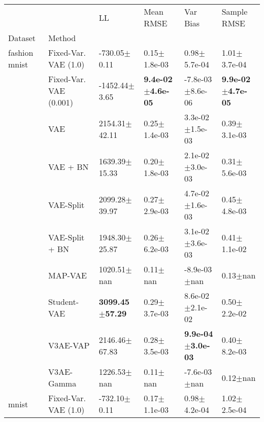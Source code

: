 \begin{tabular}{llllll}
\toprule
             &     &                           LL &                     Mean RMSE &                       Var Bias &                   Sample RMSE \\
Dataset & Method &                              &                               &                                &                               \\
\midrule
fashion mnist & Fixed-Var. VAE (1.0) &             -730.05$\pm$0.11 &              0.15$\pm$1.8e-03 &               0.98$\pm$5.7e-04 &              1.01$\pm$3.7e-04 \\
             & Fixed-Var. VAE (0.001) &            -1452.44$\pm$3.65 &  \textbf{9.4e-02$\pm$4.6e-05} &           -7.8e-03$\pm$8.6e-06 &  \textbf{9.9e-02$\pm$4.7e-05} \\
             & VAE &            2154.31$\pm$42.11 &              0.25$\pm$1.4e-03 &            3.3e-02$\pm$1.5e-03 &              0.39$\pm$3.1e-03 \\
             & VAE + BN &            1639.39$\pm$15.33 &              0.20$\pm$1.8e-03 &            2.1e-02$\pm$3.0e-03 &              0.31$\pm$5.6e-03 \\
             & VAE-Split &            2099.28$\pm$39.97 &              0.27$\pm$2.9e-03 &            4.7e-02$\pm$1.6e-03 &              0.45$\pm$4.8e-03 \\
             & VAE-Split + BN &            1948.30$\pm$25.87 &              0.26$\pm$6.2e-03 &            3.1e-02$\pm$3.6e-03 &              0.41$\pm$1.1e-02 \\
             & MAP-VAE &              1020.51$\pm$nan &                  0.11$\pm$nan &               -8.9e-03$\pm$nan &                  0.13$\pm$nan \\
             & Student-VAE &   \textbf{3099.45$\pm$57.29} &              0.29$\pm$3.7e-03 &            8.6e-02$\pm$2.1e-02 &              0.50$\pm$2.2e-02 \\
             & V3AE-VAP &            2146.46$\pm$67.83 &              0.28$\pm$3.5e-03 &   \textbf{9.9e-04$\pm$3.0e-03} &              0.40$\pm$8.2e-03 \\
             & V3AE-Gamma &              1226.53$\pm$nan &                  0.11$\pm$nan &               -7.6e-03$\pm$nan &                  0.12$\pm$nan \\
mnist & Fixed-Var. VAE (1.0) &             -732.10$\pm$0.11 &              0.17$\pm$1.1e-03 &               0.98$\pm$4.2e-04 &              1.02$\pm$2.5e-04 \\

\end{tabular}
